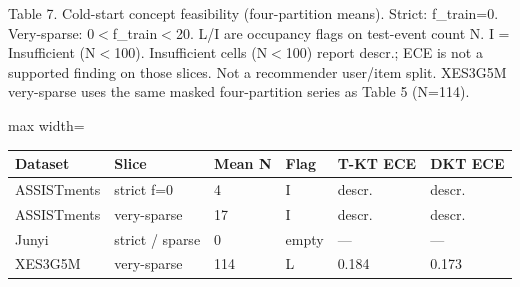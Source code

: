 \documentclass[10pt,a4paper]{article}
\begin{document}
\noindent\begin{minipage}{\textwidth}
\centering
{\fontsize{8}{9.5}\selectfont Table 7. Cold-start concept feasibility (four-partition means). Strict: f\_train=0. Very-sparse: 0$<$f\_train$<$20. L/I are occupancy flags on test-event count N. I = Insufficient (N$<$100). Insufficient cells (N$<$100) report descr.; ECE is not a supported finding on those slices. Not a recommender user/item split. XES3G5M very-sparse uses the same masked four-partition series as Table 5 (N=114).\par}
\vspace{0.35em}
\begin{adjustbox}{max width=\textwidth}
{\small
\begin{tabular}{@{}llllll@{}}
\toprule
Dataset & Slice & Mean N & Flag & T-KT ECE & DKT ECE \\
\midrule
ASSISTments & strict f=0 & 4 & I & descr. & descr. \\
ASSISTments & very-sparse & 17 & I & descr. & descr. \\
Junyi & strict / sparse & 0 & empty & --- & --- \\
XES3G5M & very-sparse & 114 & L & 0.184 & 0.173 \\
\bottomrule
\end{tabular}}
\end{adjustbox}
\end{minipage}
\vspace{0.55em}
\end{document}
